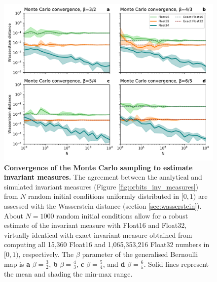 \begin{figure}[tbhp]
	\includegraphics[width=1\textwidth]{Figures/orbits/convergence.pdf}
	\caption{\textbf{Convergence of the Monte Carlo sampling to estimate invariant measures.}
	The agreement between the analytical and simulated invariant measures (Figure \ref{fig:orbits_inv_measures})
	from $N$ random initial conditions uniformly distributed in $[0,1)$ are assessed with the Wasserstein distance
	(section \ref{sec:wasserstein}). About $N = 1000$ random initial conditions allow for a robust estimate of the
	invariant measure with Float16 and Float32, virtually identical with exact invariant measure obtained from
	computing all 15,360 Float16 and 1,065,353,216 Float32 numbers in $[0,1)$, respectively. The $\beta$ parameter
	of the generalised Bernoulli map is \textbf{a} $\beta = \tfrac{3}{2}$, \textbf{b} $\beta = \tfrac{4}{3}$,
	\textbf{c} $\beta = \tfrac{5}{4}$, and \textbf{d} $\beta = \tfrac{6}{5}$. Solid lines represent the mean and shading
	the min-max range.}
	\label{fig:orbits_convergence}
\end{figure}

